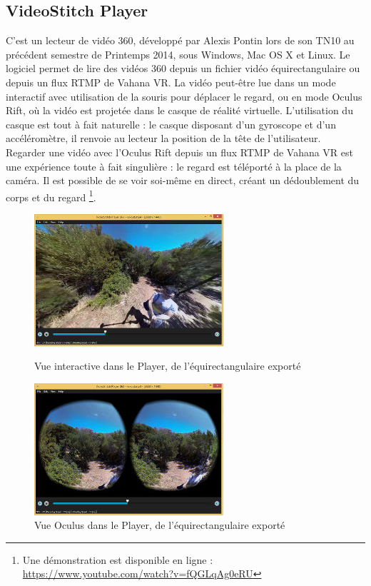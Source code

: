 \subsection{VideoStitch Player}
\label{videostitch-player-section}
C'est un lecteur de vidéo 360, développé par Alexis Pontin lors de son TN10 au précédent
semestre de Printemps 2014, sous Windows, Mac OS X et Linux. Le logiciel permet de lire des vidéos 360 depuis un 
fichier vidéo équirectangulaire ou depuis un flux RTMP de Vahana VR. La vidéo peut-être
lue dans un mode interactif avec utilisation de la souris pour déplacer le regard,
ou en mode Oculus Rift, où la vidéo est projetée dans le casque de réalité virtuelle.
L'utilisation du casque est tout à fait naturelle : le casque disposant d'un gyroscope
et d'un accéléromètre, il renvoie au lecteur la position de la tête de l'utilisateur.\\
Regarder une vidéo avec l'Oculus Rift depuis un flux RTMP de Vahana VR est une 
expérience toute à fait singulière : le regard est téléporté à la place de la caméra.
Il est possible de se voir soi-même en direct, créant un dédoublement du corps et du regard
\footnote{Une démonstration est disponible en ligne : \url{https://www.youtube.com/watch?v=fQGLqAg0eRU}}.
\begin{figure}
  \centering
  \begin{minipage}{0.45\textwidth}
     \centering
     \includegraphics[width=7cm]{images/player-interactive.jpg}
     \caption{Vue interactive dans le Player, de l'équirectangulaire exporté}
  \end{minipage}%
  \hspace{0.08\textwidth}
  \begin{minipage}{0.45\textwidth}
    \centering
    \includegraphics[width=7cm]{images/player-oculus.jpg}
    \caption{Vue Oculus dans le Player, de l'équirectangulaire exporté}
  \end{minipage}
\end{figure}

